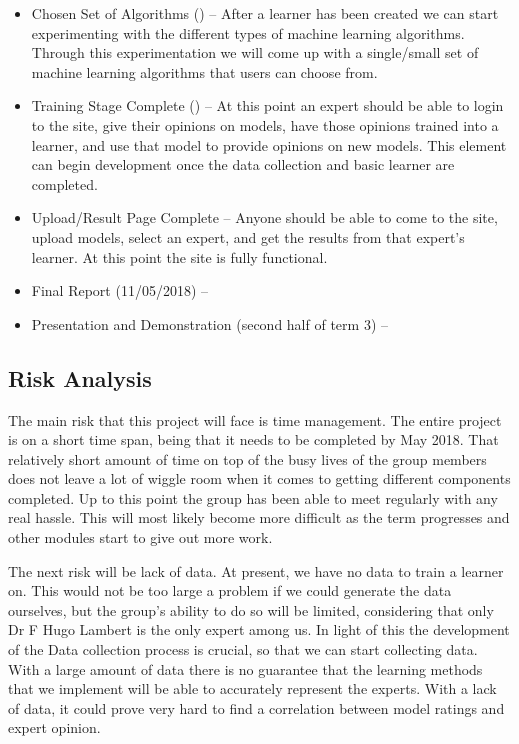 \documentclass{ecmm427_assignment}
\begin{document}
\begin{itemize}
\item Chosen Set of Algorithms () – After a learner has been created we can start experimenting with the different types of machine learning algorithms. Through this experimentation we will come up with a single/small set of machine learning algorithms that users can choose from.

\item Training Stage Complete () – At this point an expert should be able to login to the site, give their opinions on models, have those opinions trained into a learner, and use that model to provide opinions on new models. This element can begin development once the data collection and basic learner are completed.

\item Upload/Result Page Complete – Anyone should be able to come to the site, upload models, select an expert, and get the results from that expert’s learner. At this point the site is fully functional.

\item Final Report (11/05/2018) –

\item Presentation and Demonstration (second half of term 3) –

\end{itemize}

\subsection{Risk Analysis}

\quad The main risk that this project will face is time management. The entire project is on a short time span, being that it needs to be completed by May 2018. That relatively short amount of time on top of the busy lives of the group members does not leave a lot of wiggle room when it comes to getting different components completed. Up to this point the group has been able to meet regularly with any real hassle. This will most likely become more difficult as the term progresses and other modules start to give out more work. \par

\quad The next risk will be lack of data. At present, we have no data to train a learner on. This would not be too large a problem if we could generate the data ourselves, but the group’s ability to do so will be limited, considering that only Dr F Hugo Lambert is the only expert among us. In light of this the development of the Data collection process is crucial, so that we can start collecting data. With a large amount of data there is no guarantee that the learning methods that we implement will be able to accurately represent the experts. With a lack of data, it could prove very hard to find a correlation between model ratings and expert opinion.\par
\end{document}
